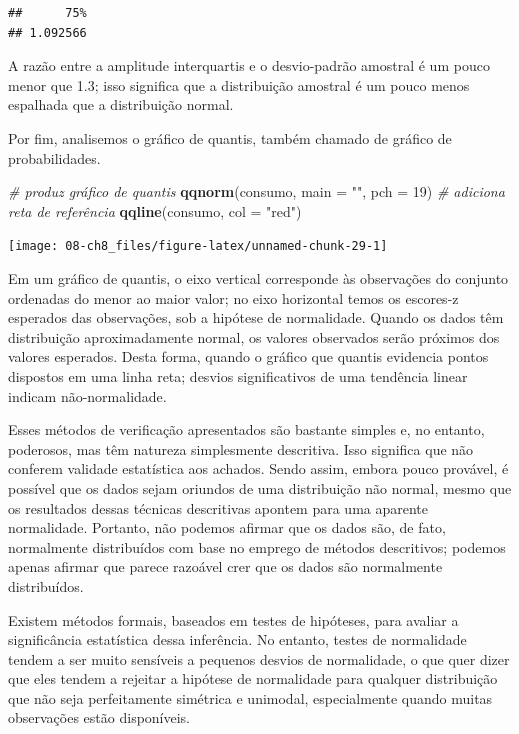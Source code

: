 \documentclass[
]{book}
\newenvironment{Shaded}{\begin{snugshade}}{\end{snugshade}}
\newcommand{\CommentTok}[1]{\textcolor[rgb]{0.56,0.35,0.01}{\textit{#1}}}
\newcommand{\DataTypeTok}[1]{\textcolor[rgb]{0.13,0.29,0.53}{#1}}
\newcommand{\DecValTok}[1]{\textcolor[rgb]{0.00,0.00,0.81}{#1}}
\newcommand{\KeywordTok}[1]{\textcolor[rgb]{0.13,0.29,0.53}{\textbf{#1}}}
\newcommand{\NormalTok}[1]{#1}
\newcommand{\StringTok}[1]{\textcolor[rgb]{0.31,0.60,0.02}{#1}}
\theoremstyle{definition}
\theoremstyle{definition}
\theoremstyle{definition}
\theoremstyle{remark}
\begin{document}
\begin{verbatim}
##      75% 
## 1.092566
\end{verbatim}

A razão entre a amplitude interquartis e o desvio-padrão amostral é um pouco menor que 1.3; isso significa que a distribuição amostral é um pouco menos espalhada que a distribuição normal.

Por fim, analisemos o gráfico de quantis, também chamado de gráfico de probabilidades.

\begin{Shaded}
\begin{Highlighting}[]
\CommentTok{# produz gráfico de quantis}
\KeywordTok{qqnorm}\NormalTok{(consumo, }
       \DataTypeTok{main =} \StringTok{""}\NormalTok{, }
       \DataTypeTok{pch =} \DecValTok{19}\NormalTok{)}
\CommentTok{# adiciona reta de referência}
\KeywordTok{qqline}\NormalTok{(consumo, }\DataTypeTok{col =} \StringTok{"red"}\NormalTok{)}
\end{Highlighting}
\end{Shaded}

\begin{center}\texttt{[image: 08-ch8\_files/figure-latex/unnamed-chunk-29-1]} \end{center}

Em um gráfico de quantis, o eixo vertical corresponde às observações do conjunto ordenadas do menor ao maior valor; no eixo horizontal temos os escores-z esperados das observações, sob a hipótese de normalidade. Quando os dados têm distribuição aproximadamente normal, os valores observados serão próximos dos valores esperados. Desta forma, quando o gráfico que quantis evidencia pontos dispostos em uma linha reta; desvios significativos de uma tendência linear indicam não-normalidade.

Esses métodos de verificação apresentados são bastante simples e, no entanto, poderosos, mas têm natureza simplesmente descritiva. Isso significa que não conferem validade estatística aos achados. Sendo assim, embora pouco provável, é possível que os dados sejam oriundos de uma distribuição não normal, mesmo que os resultados dessas técnicas descritivas apontem para uma aparente normalidade. Portanto, não podemos afirmar que os dados são, de fato, normalmente distribuídos com base no emprego de métodos descritivos; podemos apenas afirmar que parece razoável crer que os dados são normalmente distribuídos.

Existem métodos formais, baseados em testes de hipóteses, para avaliar a significância estatística dessa inferência. No entanto, testes de normalidade tendem a ser muito sensíveis a pequenos desvios de normalidade, o que quer dizer que eles tendem a rejeitar a hipótese de normalidade para qualquer distribuição que não seja perfeitamente simétrica e unimodal, especialmente quando muitas observações estão disponíveis.
\end{document}

